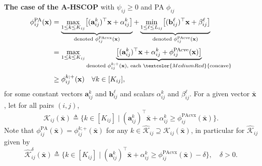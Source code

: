 \documentclass[aspectratio=169,xcolor=dvipsnames]{beamer}
\begin{document}
\begin{frame}
  \footnotesize
  \setlength{\abovedisplayskip}{3pt}
  \setlength{\belowdisplayskip}{3pt}

  \textbf{The case of the A-HSCOP} \textcolor{MediumRed}{with
  $\psi_{ij}\geq 0$ and PA $\phi_{ij}$}
  \[
    \begin{aligned}
      \phi^{\mathrm{PA}}_{ij}(\mathbf{x}) &=
        \underbrace{\max_{1\leq k\leq K_{ij}}\bigl[(\mathbf{a}^k_{ij})^\top
          \mathbf{x}+\alpha^k_{ij}\bigr]}_{
          \text{denoted }\phi^{\mathrm{PAcvx}}_{ij}(\mathbf{x})}
        +\underbrace{\min_{1\leq\ell\leq L_{ij}}\bigl[(\mathbf{b}^\ell_{ij})
          ^\top\mathbf{x}+\beta^\ell_{ij}\bigr]}_{
          \text{denoted }\phi^{\mathrm{PAcve}}_{ij}(\mathbf{x})}\\[2pt]
      &=\max_{1\leq k\leq K_{ij}}\underbrace{\bigl[(\mathbf{a}^k_{ij})^\top
          \mathbf{x}+\alpha^k_{ij}+\phi^{\mathrm{PAcve}}_{ij}(\mathbf{x})
          \bigr]}_{\text{denoted }\phi^{k;+}_{ij}(\mathbf{x}),\text{ each }
          \textcolor{MediumRed}{\text{concave}}}\\[2pt]
      &\geq\phi^{k;+}_{ij}(\mathbf{x})\quad\forall k\in[K_{ij}],
    \end{aligned}
  \]
  for some constant vectors $\mathbf{a}^k_{ij}$ and $\mathbf{b}^\ell_{ij}$
  and scalars $\alpha^k_{ij}$ and $\beta^\ell_{ij}$. For a given vector
  $\bar{\mathbf{x}}$, let for all pairs $(i,j)$,
  \[
    \mathcal{K}_{ij}(\bar{\mathbf{x}})\triangleq\bigl\{k\in[K_{ij}]\mid
      (\mathbf{a}^k_{ij})^\top\bar{\mathbf{x}}+\alpha^k_{ij}\geq
      \phi^{\mathrm{PAcvx}}_{ij}(\bar{\mathbf{x}})\bigr\}.
  \]
  Note that $\phi^{\mathrm{PA}}_{ij}(\bar{\mathbf{x}})
  =\phi^{k;+}_{ij}(\bar{\mathbf{x}})$ for any
  $k\in\widehat{\mathcal{K}}_{ij}\supseteq\mathcal{K}_{ij}(\bar{\mathbf{x}})$,
  in particular for $\widehat{\mathcal{K}}_{ij}$ given by
  \[
    \widehat{\mathcal{K}}^\delta_{ij}(\bar{\mathbf{x}})\triangleq
      \bigl\{k\in[K_{ij}]\mid(\mathbf{a}^k_{ij})^\top\bar{\mathbf{x}}
      +\alpha^k_{ij}\geq\phi^{\mathrm{PAcvx}}_{ij}(\bar{\mathbf{x}})-\delta
      \bigr\},\quad\delta>0.
  \]
\end{frame}
\end{document}
